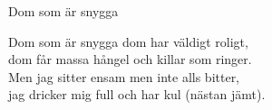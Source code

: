 \begin{song}{Dom som är snygga}
	
	
	
	Dom som är snygga dom har väldigt roligt,\\
	dom får massa hångel och killar som ringer.\\
	Men jag sitter ensam men inte alls bitter,\\
	jag dricker mig full och har kul (nästan jämt).
	
\end{song}
